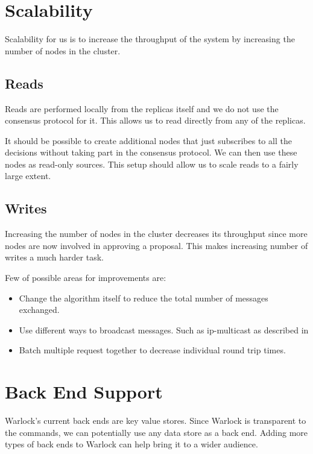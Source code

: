 \section{Scalability}

Scalability for us is to increase the throughput of the system
by increasing the number of nodes in the cluster.

\subsection{Reads}

Reads are performed locally from the replicas itself and we do not use the
consensus protocol for it. This allows us to read directly from any of the
replicas.

It should be possible to create additional nodes that just subscribes to all
the decisions without taking part in the consensus protocol. We can then use
these nodes as read-only sources. This setup should allow us to scale reads
to a fairly large extent.

\subsection{Writes}

Increasing the number of nodes in the cluster decreases its throughput since
more nodes are now involved in approving a proposal. This makes increasing
number of writes a much harder task.

Few of possible areas for improvements are:

\begin{itemize}
  \item Change the algorithm itself to reduce the total number of messages
    exchanged.
  \item Use different ways to broadcast messages. Such as ip-multicast as
    described in \citet{MarandiPSP10}
  \item Batch multiple request together to decrease individual round trip times.
\end{itemize}

\section{Back End Support}

Warlock's current back ends are key value stores. Since Warlock is transparent
to the commands, we can potentially use any data store as a back end. Adding
more types of back ends to Warlock can help bring it to a wider audience.

